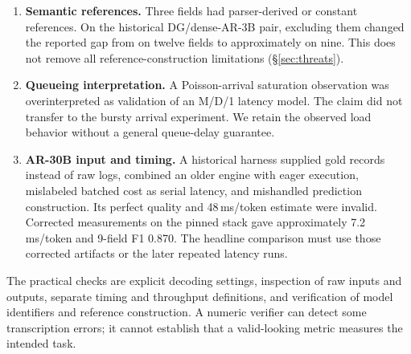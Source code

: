\begin{enumerate}
\item \textbf{Semantic references.} Three fields had parser-derived or
constant references. On the historical DG/dense-AR-3B pair, excluding
them changed the reported gap from \twelveGap{} on twelve fields to
approximately \qualityGap{} on nine. This does not remove all
reference-construction limitations (\S\ref{sec:threats}).
\item \textbf{Queueing interpretation.} A Poisson-arrival saturation
observation was overinterpreted as validation of an M/D/1 latency model.
The claim did not transfer to the bursty arrival experiment. We retain
the observed load behavior without a general queue-delay guarantee.
\item \textbf{AR-30B input and timing.} A historical harness supplied
gold records instead of raw logs, combined an older engine with eager
execution, mislabeled batched cost as serial latency, and mishandled
prediction construction. Its perfect quality and 48\,ms/token estimate
were invalid. Corrected measurements on the pinned stack gave
approximately 7.2\,ms/token and 9-field F1 0.870. The headline comparison
must use those corrected artifacts or the later repeated latency runs.
\end{enumerate}

The practical checks are explicit decoding settings, inspection of raw
inputs and outputs, separate timing and throughput definitions, and
verification of model identifiers and reference construction. A numeric
verifier can detect some transcription errors; it cannot establish that
a valid-looking metric measures the intended task.
